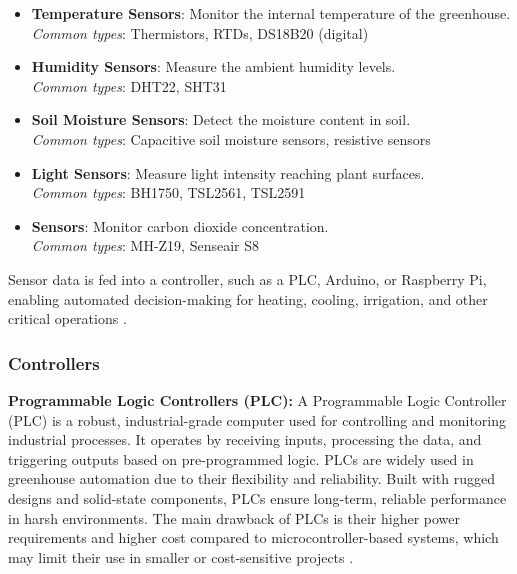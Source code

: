 \begin{itemize}
  \item \textbf{Temperature Sensors}: Monitor the internal temperature of the greenhouse.\\
  \textit{Common types}: Thermistors, RTDs, DS18B20 (digital)
  
  \item \textbf{Humidity Sensors}: Measure the ambient humidity levels.\\
  \textit{Common types}: DHT22, SHT31

  \item \textbf{Soil Moisture Sensors}: Detect the moisture content in soil.\\
  \textit{Common types}: Capacitive soil moisture sensors, resistive sensors

  \item \textbf{Light Sensors}: Measure light intensity reaching plant surfaces.\\
  \textit{Common types}: BH1750, TSL2561, TSL2591

  \item \textbf{ Sensors}: Monitor carbon dioxide concentration.\\
  \textit{Common types}: MH-Z19, Senseair S8
\end{itemize}

Sensor data is fed into a controller, such as a PLC, Arduino, or Raspberry Pi, enabling automated decision-making for heating, cooling, irrigation, and other critical operations \citep{automated_greenhouse_iot}.


\subsubsection{Controllers} \label{control}

\textbf{Programmable Logic Controllers (PLC):} A Programmable Logic Controller (PLC) is a robust, industrial-grade computer used for controlling and monitoring industrial processes. It operates by receiving inputs, processing the data, and triggering outputs based on pre-programmed logic. PLCs are widely used in greenhouse automation due to their flexibility and reliability. Built with rugged designs and solid-state components, PLCs ensure long-term, reliable performance in harsh environments. The main drawback of PLCs is their higher power requirements and higher cost compared to microcontroller-based systems, which may limit their use in smaller or cost-sensitive projects \citep{dwinugroho2021greenhouse}.

